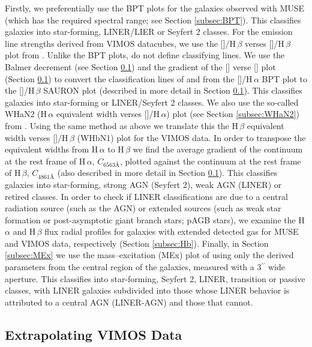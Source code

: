 	Firstly, we preferentially use the BPT plots for the galaxies observed with MUSE (which has the required spectral range; see Section \ref{subsec:BPT}). This classifies galaxies into star-forming, LINER/LIER or Seyfert 2 classes. For the emission line strengths derived from VIMOS datacubes, we use the []/H\,$\beta$ verses []/H\,$\beta$ plot from \citet[hereafter the SAURON plot]{Sarzi2010}. Unlike the BPT plots, \citet{Sarzi2010} do not define classifying lines. We use the Balmer decrement (see Section \ref{subsec:Ndec}) and the gradient of the [] verse [] plot (Section \ref{subsec:Ndec}) to convert the classification lines of \citet{Kewley2001} and \citet{Kauffmann2003a} from the []/H\,$\alpha$ BPT plot to the []/H\,$\beta$ SAURON plot (described in more detail in Section \ref{subsec:Ndec}). This classifies galaxies into star-forming or LINER/Seyfert 2 classes. We also use the so-called WHaN2 (H\,$\alpha$ equivalent width verses []/H\,$\alpha$) plot (see Section \ref{subsec:WHaN2}) from \citet{CidFernandes2011}. Using the same method as above we translate this the H\,$\beta$ equivalent width verses []/H\,$\beta$ (WHbN1) plot for the VIMOS data. In order to transpose the equivalent widths from H\,$\alpha$ to H\,$\beta$ we find the average gradient of the continuum at the rest frame of H\,$\alpha$, $C_\text{6563\AA}$, plotted against the continuum at the rest frame of H\,$\beta$, $C_\text{4861\AA}$ (also described in more detail in Section \ref{subsec:Ndec}). This classifies galaxies into star-forming, strong AGN (Seyfert 2), weak AGN (LINER) or retired classes. In order to check if LINER classifications are due to a central radiation source (such as the AGN) or extended sources (such as weak star formation or post-asymptotic giant branch stars; pAGB stars), we examine the H\,$\alpha$ and H\,$\beta$ flux radial profiles for galaxies with extended detected gas for MUSE and VIMOS data, respectively (Section \ref{subsec:Hb}). Finally, in Section \ref{subsec:MEx} we use the mass--excitation (MEx) plot of \cite{Nyland2016} using only the derived parameters from the central region of the galaxies, measured with a 3$^{\prime\prime}$ wide aperture. This classifies into star-forming, Seyfert 2, LINER, transition or passive classes, with LINER galaxies subdivided into those whose LINER behavior is attributed to a central AGN (LINER-AGN) and those that cannot. 


	\subsection{Extrapolating VIMOS Data}
		\label{subsec:Ndec}

